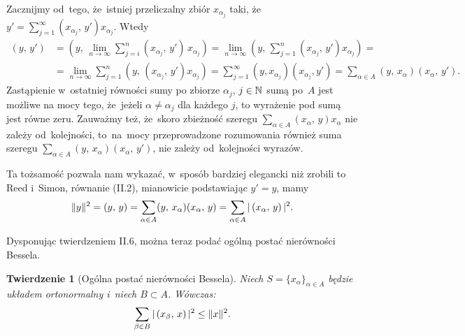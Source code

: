 \documentclass[a4paper,11pt]{article}
\newtheorem{theorem}{Twierdzenie} %
\begin{document}
Zacznijmy od~tego, że~istniej przeliczalny zbiór $x_{ \alpha_{ j } }$
taki,
że~$y' = \sum_{ j = 1 }^{ \infty } ( x_{ \alpha_{ j } }, \, y' ) x_{ \alpha_{ j } }$.
Wtedy
\begin{equation}
  \label{eq:RS-Vol-I-s01-24}
  \begin{split}
    ( y, \, y' )
    &=
      ( y, \, \lim_{ n \to \infty } \sum_{ j = i }^{ n }
      ( x_{ \alpha_{ j } }, \,  y' ) \, x_{ \alpha_{ j } } )
      =
      \lim_{ n \to \infty } ( y, \, \sum_{ j = 1 }^{ n }
      ( x_{ \alpha_{ j } }, \, y' ) x_{ \alpha_{ j } } ) = \\
    &=
      \lim_{ n \to \infty } \sum_{ j = 1 }^{ n } ( y, \, ( x_{ \alpha_{ j } }, \, y' )
      x_{ \alpha_{ j } } )
      =
      \sum_{ j = 1 }^{ \infty } ( y, x_{ \alpha_{ j } } ) ( x_{ \alpha_{ j } }, y' )
      =
      \sum_{ \alpha \in A } ( y, \, x_{ \alpha } ) ( x_{ \alpha }, \,  y' ).
  \end{split}
\end{equation}
Zastąpienie w~ostatniej równości sumy po zbiorze
$\alpha_{ j }$, $j \in \mathbb{N}$ sumą po~$A$ jest możliwe na mocy tego,
że~jeżeli $\alpha \neq \alpha_{ j }$ dla każdego $j$, to wyrażenie pod
sumą jest równe zeru. Zauważmy też, że~skoro zbieżność szeregu
$\sum_{ \alpha \in A } ( x_{ \alpha }, \, y ) x_{ \alpha }$ nie zależy
od~kolejności, to~na~mocy przeprowadzone rozumowania również suma
szeregu
$\sum_{ \alpha \in A } ( y, \, x_{ \alpha } ) ( x_{ \alpha }, \, y' )$, nie
zależy od~kolejności wyrazów.

Ta tożsamość pozwala nam wykazać, w~sposób bardziej elegancki niż
zrobili to Reed i~Simon, równanie (II.2), mianowicie podstawiając
$y' = y$, mamy
\begin{equation}
  \label{eq:RS-Vol-I-s01-25}
  \lVert{  y  }\rVert^{ 2 } = ( y, \, y ) =
  \sum_{ \alpha \in A } ( y, \, x_{ \alpha } ) ( x_{ \alpha }, \, y )
  = \sum_{ \alpha \in A } |\, {  ( x_{ \alpha }, \,  y )  } \,|^{ 2 }.
\end{equation}

\vspace{\spaceFour}



\start {} Dysponując twierdzeniem II.6, można teraz podać ogólną
postać nierówności Bessela.




\begin{theorem}[Ogólna postać nierówności Bessela]

  Niech $S = \{ x_{ \alpha } \}_{ \alpha \in A }$ będzie układem
  ortonormalny i~niech $B \subset A$. Wówczas:
  \begin{equation}
    \label{eq:RS-Vol-I-s01-26}
    \sum_{ \beta \in B } |\, {  ( x_{ \beta }, \, x )  } \,|^{ 2 } \leq \lVert{  x  }\rVert^{ 2 }.
  \end{equation}

\end{theorem}
\end{document}
